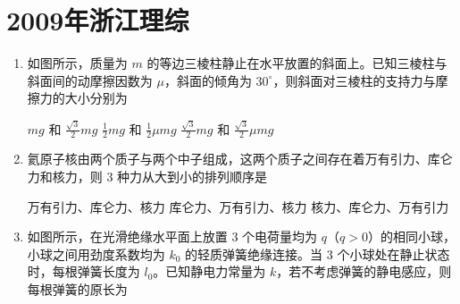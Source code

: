 \documentclass[\gkver]{gaokaozhenti}
\begin{document}
\chapter{2009年浙江理综}

\begin{enumerate}
\item
如图所示，质量为 $m$ 的等边三棱柱静止在水平放置的斜面上。已知三棱柱与斜面间的动摩擦因数为 $\mu$，斜面的倾角为 $30^\circ$，则斜面对三棱柱的支持力与摩擦力的大小分别为


{$mg$ 和 $\frac{\sqrt{3}}{2}mg$}
{$\frac{1}{2}mg$ 和 $\frac{1}{2}\mu mg$}
{$\frac{\sqrt{3}}{2}mg$ 和 $\frac{\sqrt{3}}{2}\mu mg$}


\item
氦原子核由两个质子与两个中子组成，这两个质子之间存在着万有引力、库仑力和核力，则 3 种力从大到小的排列顺序是

{万有引力、库仑力、核力}
{库仑力、万有引力、核力}
{核力、库仑力、万有引力}


\item
如图所示，在光滑绝缘水平面上放置 3 个电荷量均为 $q$（$q>0$）的相同小球，小球之间用劲度系数均为 $k_{0}$ 的轻质弹簧绝缘连接。当 3 个小球处在静止状态时，每根弹簧长度为 $l_{0}$。已知静电力常量为 $k$，若不考虑弹簧的静电感应，则每根弹簧的原长为


\end{enumerate}
\end{document}
